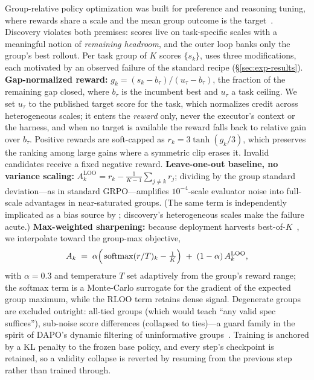 Group-relative policy optimization was built for preference and
reasoning tuning, where rewards share a scale and the mean group outcome is
the target~\citep{grpo,rloo}.  Discovery violates both premises: scores live
on task-specific scales with a meaningful notion of \emph{remaining
headroom}, and the outer loop banks only the group's best rollout.  Per task
group of $K$ scores $\{s_k\}$, \method{} uses three modifications, each
motivated by an observed failure of the standard recipe
(\S\ref{sec:exp-results}).
\textbf{Gap-normalized reward:} $g_k = (s_k - b_\tau)/(u_\tau - b_\tau)$,
the fraction of the remaining gap closed, where $b_\tau$ is the incumbent
best and $u_\tau$ a task ceiling.  We set $u_\tau$ to the published target score
for the task, which normalizes credit across heterogeneous scales; it enters the
\emph{reward} only, never the executor's context or the harness, and when no
target is available the reward falls back to relative gain over $b_\tau$.
Positive rewards are soft-capped as
$r_k = 3\tanh(g_k/3)$, which preserves the ranking among large gains where a
symmetric clip erases it.  Invalid candidates receive a fixed negative
reward.
\textbf{Leave-one-out baseline, no variance scaling:}
$A^{\mathrm{LOO}}_k = r_k - \frac{1}{K-1}\sum_{j\ne k} r_j$; dividing by the
group standard deviation---as in standard GRPO---amplifies $10^{-4}$-scale
evaluator noise into full-scale advantages in near-saturated groups.  (The
same term is independently implicated as a bias source by
\citet{drgrpo}; discovery's heterogeneous scales make the failure acute.)
\textbf{Max-weighted sharpening:} because deployment harvests
best-of-$K$~\citep{bond,infalign}, we interpolate toward the group-max
objective,
\begin{equation}
A_k \;=\; \alpha\Big(\operatorname{softmax}(r/T)_k - \tfrac{1}{K}\Big)
        \;+\; (1-\alpha)\, A^{\mathrm{LOO}}_k,
\label{eq:advantage}
\end{equation}
with $\alpha = 0.3$ and temperature $T$ set adaptively from the group's
reward range; the softmax term is a Monte-Carlo surrogate for the gradient
of the expected group maximum, while the RLOO term retains dense signal.
Degenerate groups are excluded outright: all-tied groups (which would teach
``any valid spec suffices''), sub-noise score differences (collapsed to
ties)---a guard family in the spirit of DAPO's dynamic filtering of uninformative
groups~\citep{dapo}.  Training is anchored by a KL penalty to the frozen
base policy, and every step's checkpoint is retained, so a validity collapse is
reverted by resuming from the previous step rather than trained through.


